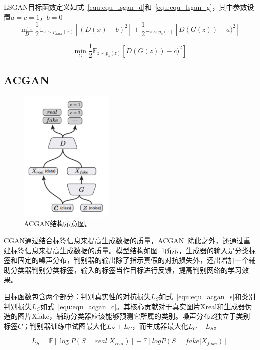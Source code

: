 LSGAN目标函数定义如式~\ref{equ:equ_lsgan_d}和~\ref{equ:equ_lsgan_g}，其中参数设置$a=c=1$，$b=0$
\begin{equation}
\label{equ:equ_lsgan_d}
\min \limits_D \frac{1}{2} \mathbb{E}_{x \sim p_{data}(x)}[(D(x)-b)^2] + \frac{1}{2} \mathbb{E}_{z \sim{p_z(z)}}[D(G(z))-a)^2]
\end{equation}

\begin{equation}
\label{equ:equ_lsgan_g}
\min \limits_G\frac{1}{2}\mathbb{E}_{z \sim{p_z(z)}}[D(G(z))-c)^2]
\end{equation}


\subsection{ACGAN}
\begin{figure}[ht]
    \centering
	\includegraphics[width=0.4\textwidth]{figures/acgan.pdf}
	\caption{ACGAN结构示意图。}
	\label{fig:pic_acgan}
\end{figure}

CGAN通过结合标签信息来提高生成数据的质量，ACGAN~\cite{odena2017conditional}除此之外，还通过重建标签信息来提高生成数据的质量。模型结构如图~\ref{fig:pic_acgan}所示，生成器的输入是分类标签和固定的噪声分布，判别器的输出除了指示真假的对抗损失外，还出增加一个辅助分类器判别分类标签，输入的标签当作目标进行反馈，提高判别网络的学习效果。

目标函数包含两个部分：判别真实性的对抗损失$L_S$如式~\ref{equ:equ_acgan_s}和类别判别损失$L_C$如式~\ref{equ:equ_acgan_c}。其核心贡献对于真实图片Xreal和生成器伪造的图片Xfake，辅助分类器应该能够预测它所属的类别。噪声分布$Z$独立于类别标签$C$；判别器训练中试图最大化$L_S+L_C$，而生成器最大化$L_C-L_S$。

\begin{equation}
\label{equ:equ_acgan_s}
L_S = \mathbb{E}[\log P(S = real | X_{real})] + \mathbb{E}[logP(S = fake | X_{fake})]
\end{equation}

